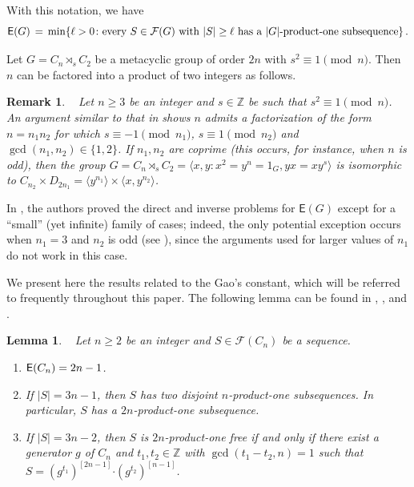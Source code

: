 \documentclass[leqno,a4paper]{amsart}
\def\E{{\sf E}}
\def\F{{\mathcal F}}
\def\bd{{\boldsymbol{\cdot}}}
\def\Z{\mathbb Z}
\theoremstyle{plain}
\newtheorem{lemma}[theorem]{Lemma}
\newtheorem{remark}[theorem]{Remark}
\theoremstyle{definition}
\numberwithin{equation}{section}
\begin{document}
	With this notation, we have
	\[
	  \E(G) \, = \, \min\{\ell>0 \colon \text{every $S \in \F(G)$ with $|S| \ge \ell$ has a $|G|$-product-one subsequence}\} \,.
	\]
	
	
	Let $G = C_n \rtimes_s C_2$ be a metacyclic group of order $2n$ with $s^{2} \equiv 1 \pmod{n}$.
	Then $n$ can be factored into a product of two integers as follows.
	
	\smallskip
	\begin{remark} \label{rmk}~
	Let $n \ge 3$ be an integer and $s \in \Z$ be such that $s^2 \equiv 1 \pmod n$. An argument similar to that in \cite[Lemma 1.4]{AMR} shows  $n$ admits a factorization of the form $n = n_1n_2$ for which $s \equiv -1 \pmod {n_1}$, $s \equiv 1 \pmod {n_2}$ and $\gcd(n_1,n_2) \in \{1,2\}$. If $n_1,n_2$ are coprime (this occurs, for instance, when $n$ is odd), then the group $G = C_n \rtimes_s C_2 = \langle x,y \colon x^2 = y^n = 1_G, yx = xy^s \rangle$ is isomorphic to $C_{n_2} \times D_{2n_1} = \langle y^{n_1} \rangle \times \langle x, y^{n_2} \rangle$.
	\end{remark}
	
	
	\smallskip
	In \cite{AMR}, the authors proved the direct and inverse problems for $\mathsf E (G)$ except for a ``small'' (yet infinite) family of cases; indeed, the only potential exception occurs when $n_1 = 3$ and $n_2$ is odd (see \cite[Theorems 1.6 and 1.7]{AMR}), since the arguments used for larger values of $n_1$ do not work in this case.
	
	


	We present here the results related to the Gao's constant, which will be referred to frequently throughout this paper. The following lemma can be found in \cite{EGZ}, \cite[Lemma 2.2]{AMR}, and \cite[Lemma 2.5]{OZ1}.
	
	
	\smallskip
	\begin{lemma} \label{inverseCn}~
	Let $n \ge 2$ be an integer and $S \in \F(C_n)$ be a sequence.
		\begin{enumerate}
		\item $\E(C_n) = 2n-1$.
		
		\smallskip
		\item If $|S| = 3n-1$, then $S$ has two disjoint $n$-product-one subsequences. In particular, $S$ has a $2n$-product-one subsequence.
		
		\smallskip
		\item If $|S| = 3n-2$, then $S$ is $2n$-product-one free if and only if there exist a generator $g$ of $C_n$ and $t_1, t_2  \in \Z$ with $\gcd(t_1 - t_2,n) = 1$ such that $S = (g^{t_1})^{[2n-1]} \bd (g^{t_2})^{[n-1]}$.
		\end{enumerate}
	\end{lemma}
	
\end{document}
